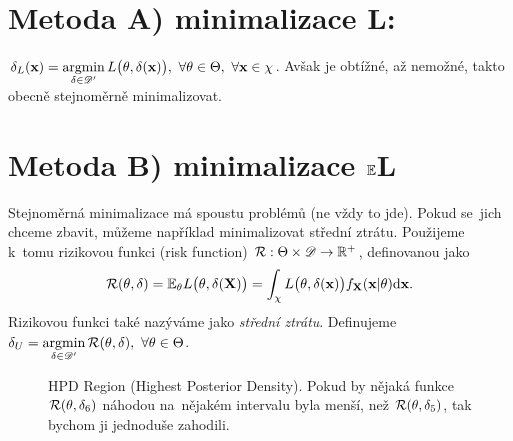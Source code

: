 \section{Metoda A) minimalizace L:} $\delta_L(\textbf{x})=\mathop{\mathrm{argmin}}\limits_{\delta\in\mathscr{D}'} L\big(\theta,\delta(\textbf{x})\big),~\forall \theta\in\Theta,~\forall\textbf{x}\in\chi$. Avšak je obtížné, až nemožné, takto obecně stejnoměrně minimalizovat.

\section{Metoda B) minimalizace $\mathbb{E} $L}
Stejnoměrná minimalizace má spoustu problémů (ne vždy to jde). Pokud se~jich chceme zbavit, můžeme například minimalizovat střední ztrátu. Použijeme k~tomu rizikovou funkci (risk function) $\mathcal{R}:\Theta\times\mathscr{D} \to\mathbb{R}^+$, definovanou jako $$\mathcal{R}(\theta,\delta)=\mathbb{E}_\theta L\big(\theta,\delta(\textbf{X})\big)=\int_\chi L\big(\theta,\delta(\textbf{x})\big)f_\textbf{X}(\textbf{x}|\theta)\mathrm{d}\textbf{x}.$$
Rizikovou funkci také nazýváme jako \textit{střední ztrátu}. Definujeme $\delta_U=\mathop{\mathrm{argmin}}\limits_{\delta\in\mathscr{D}'} \mathcal{R}(\theta,\delta),~\forall\theta\in\Theta$.

\begin{figure}[h]
	\centering
	\caption{HPD Region (Highest Posterior Density). Pokud by nějaká funkce $ \mathcal{R} (\theta, \delta_6 )
		$ náhodou na~nějakém intervalu byla menší, než $ \mathcal{R} (\theta, \delta_5 )
		$, tak bychom ji jednoduše zahodili.}\label{HPD}
\end{figure}

